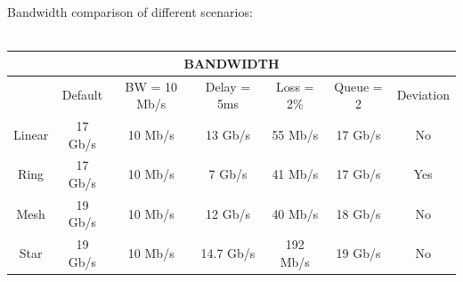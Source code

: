 \documentclass[a4paper, 11pt]{article}
\begin{document}
\noindent
Bandwidth comparison of different scenarios:\\ \\

\begin{tabular}{|c|c|c|c|c|c|c|}
\hline 
\multicolumn{7}{|c|}{BANDWIDTH }\tabularnewline
\hline 
\hline 
 & Default & BW = 10 Mb/s & Delay = 5ms & Loss = 2\% & Queue = 2 & Deviation\tabularnewline
\hline 
Linear & 17 Gb/s & 10 Mb/s & 13 Gb/s & 55 Mb/s & 17 Gb/s & No\tabularnewline
\hline 
Ring & 17 Gb/s & 10 Mb/s & 7 Gb/s & 41 Mb/s & 17 Gb/s & Yes\tabularnewline
\hline 
Mesh & 19 Gb/s  & 10 Mb/s & 12 Gb/s & 40 Mb/s  & 18 Gb/s & No\tabularnewline
\hline 
Star & 19 Gb/s  & 10 Mb/s & 14.7 Gb/s & 192 Mb/s & 19 Gb/s & No\tabularnewline
\hline 
\end{tabular}



\newpage
\end{document}

